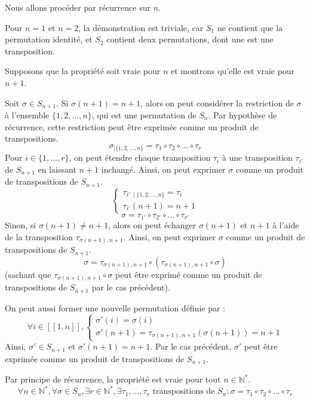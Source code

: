 \documentclass[11pt, a4paper]{article}
\theoremstyle{definition}
\newcommand{\N}{\mathbb{N}}
\begin{document}
Nous allons procéder par récurrence sur $n$.

Pour $n=1$ et $n=2$, la démonstration est triviale, car $S_1$ ne contient que la permutation identité, et $S_2$ contient deux permutations, dont une est une transposition.

Supposons que la propriété soit vraie pour $n$ et montrons qu'elle est vraie pour $n+1$.

Soit $\sigma \in S_{n+1}$. Si $\sigma(n+1) = n+1$, alors on peut considérer la restriction de $\sigma$ à l'ensemble $\{1, 2, \dots, n\}$, qui est une permutation de $S_n$. Par hypothèse de récurrence, cette restriction peut être exprimée comme un produit de transpositions.
$$\sigma_{\mid \{1, 2, \dots, n\}} = \tau_1 \circ \tau_2 \circ \dots \circ \tau_r$$
Pour $i \in \{1, \dots, r\}$, on peut étendre chaque transposition
$\tau_i$ à une transposition $\tau_{i'}$ de $S_{n+1}$ en laissant $n+1$ inchangé. Ainsi, on peut exprimer $\sigma$ comme un produit de transpositions de $S_{n+1}$.
$$\begin{cases} 
	\tau_{i'~\mid \{1, 2, \dots, n\}} = \tau_i \\
	\tau_{i'}(n+1) = n+1
\end{cases}$$
$$\sigma = \tau_{1'} \circ \tau_{2'} \circ \dots \circ \tau_{r'}$$
Sinon, si $\sigma(n+1) \ne n+1$, alors on peut échanger $\sigma(n+1)$ et $n+1$ à l'aide de la transposition $\tau_{\sigma(n+1),n+1}$. Ainsi, on peut exprimer $\sigma$ comme un produit de transpositions de $S_{n+1}$.
$$\sigma = \tau_{\sigma(n+1),n+1} \circ (\tau_{\sigma(n+1),n+1} \circ \sigma)$$
(sachant que $\tau_{\sigma(n+1),n+1} \circ \sigma$ peut être exprimé comme un produit de transpositions de $S_{n+1}$ par le cas précédent).

On peut aussi former une nouvelle permutation définie par :
$$\forall i \in [\![1,n]\!], \begin{cases}
	\sigma'(i) = \sigma(i) \\
	\sigma'(n+1) = \tau_{\sigma(n+1),n+1}(\sigma(n+1)) = n+1
\end{cases}$$
Ainsi, $\sigma' \in S_{n+1}$ et $\sigma'(n+1) = n+1$. Par le cas précédent, $\sigma'$ peut être exprimée comme un produit de transpositions de $S_{n+1}$.

Par principe de récurrence, la propriété est vraie pour tout $n \in \N^*$.
$$\forall n \in \N^*, \forall \sigma \in S_n, \exists r \in \N^*, \exists \tau_1, \dots, \tau_r \text{ transpositions de } S_n : \sigma = \tau_1 \circ \tau_2 \circ \dots \circ \tau_r$$
\end{document}
